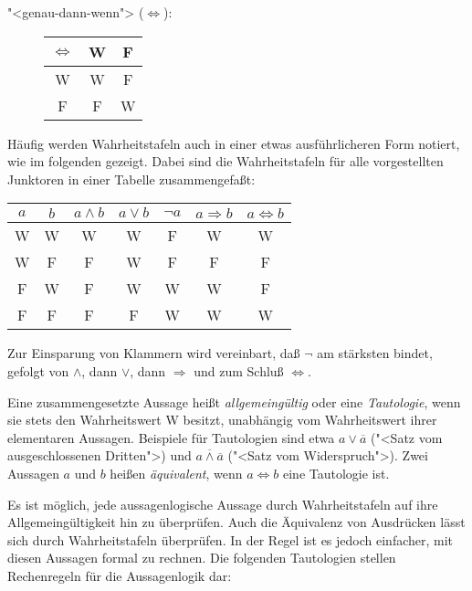 \begin{description}
\item["<genau-dann-wenn"> ($\Leftrightarrow$):]
\hspace{2em}\begin{tabular}{c||c|c}
$\Leftrightarrow$     &  W   &  F \\ \hline \hline
    W      &  W   &  F \\ \hline
    F      &  F   &  W 
\end{tabular}
\end{description}

Häufig werden Wahrheitstafeln auch in einer etwas
ausführlicheren Form notiert, wie im folgenden gezeigt.  Dabei sind die
Wahrheitstafeln für alle vorgestellten Junktoren in einer Tabelle
zusammengefaßt:

\begin{center}
\begin{tabular}{c|c||c|c|c|c|c}
$a$ & $b$ & $a\wedge b$ & $a\vee b$ & $\neg a$ & $a\Rightarrow b$ & $a\Leftrightarrow b$\\ \hline\hline
W   &  W  &     W       &     W     &    F     &         W        & W\\ \hline
W   &  F  &     F       &     W     &    F     &         F        & F\\ \hline
F   &  W  &     F       &     W     &    W     &         W        & F\\ \hline
F   &  F  &     F       &     F     &    W     &         W        & W
\end{tabular}
\end{center}
%
Zur Einsparung von Klammern wird vereinbart, daß $\neg$ am stärksten 
\label{prio}
bindet, gefolgt von $\wedge$, dann $\vee$, dann $\Rightarrow$ und zum Schluß 
$\Leftrightarrow$.

Eine zusammengesetzte Aussage heißt \emph{allgemeingültig} oder eine
\emph{Tautologie}, 
wenn sie stets den Wahrheitswert W besitzt, unabhängig vom
Wahr\-heits\-wert ihrer elementaren  Aussagen. Beispiele für Tautologien sind
etwa $a \vee \overline{a}$ ("<Satz vom ausgeschlossenen Dritten">)
und $\overline{a \wedge \overline{a}}$ ("<Satz vom Widerspruch">). Zwei 
Aussagen
$a$ und $b$ heißen \emph{äquivalent}, wenn $a \Leftrightarrow b$ eine
Tautologie ist.

Es ist möglich, jede aussagenlogische Aussage durch
Wahrheitstafeln auf ihre Allgemeingültigkeit hin zu überprüfen.  Auch
die Äquivalenz von Ausdrücken lässt sich durch Wahrheitstafeln
überprüfen.  In der Regel ist es jedoch einfacher, mit diesen
Aussagen formal zu rechnen.
Die folgenden Tautologien stellen Rechenregeln für die Aussagenlogik
dar:

